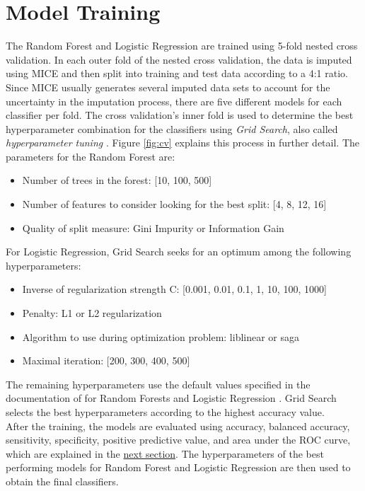 \section{Model Training}
The Random Forest and Logistic Regression are trained using 5-fold nested cross 
validation.
In each outer fold of the nested cross validation, the data is imputed using 
MICE and then split into training and test data according to a 4:1 ratio. Since 
MICE usually generates several imputed data sets to account for the uncertainty 
in the imputation process, there are five different models for each classifier 
per fold. The cross validation's inner fold is used to determine the best 
hyperparameter combination for the classifiers using \textit{Grid Search}, also 
called \textit{hyperparameter tuning} \cite{RN191}. Figure \ref{fig:cv} 
explains this process in further detail. The parameters for the Random Forest 
are:
\begin{itemize}
 \item Number of trees in the forest: [10, 100, 500]
 \item Number of features to consider looking for the best split: [4, 8, 12, 16]
 \item Quality of split measure: Gini Impurity or Information Gain
\end{itemize}
For Logistic Regression, Grid Search seeks for an optimum among the 
following hyperparameters:
\begin{itemize}
 \item Inverse of regularization strength C: [0.001, 0.01, 0.1, 1, 10, 100, 
1000]
 \item Penalty: L1 or L2 regularization
 \item Algorithm to use during optimization problem: liblinear or saga
 \item Maximal iteration: [200, 300, 400, 500]
\end{itemize}
The remaining hyperparameters use the default values specified in the 
documentation of  for Random Forests and Logistic Regression 
\cite{RN191}.
Grid Search selects the best hyperparameters according to the highest accuracy 
value.
\\
After the training, the models are evaluated using accuracy, balanced 
accuracy, sensitivity, 
specificity, positive predictive value, and area under the ROC curve, which are 
explained in the \hyperref[sec:eval]{next section}.
The hyperparameters of the best performing models for Random Forest and 
Logistic Regression are then used to obtain the final classifiers.
